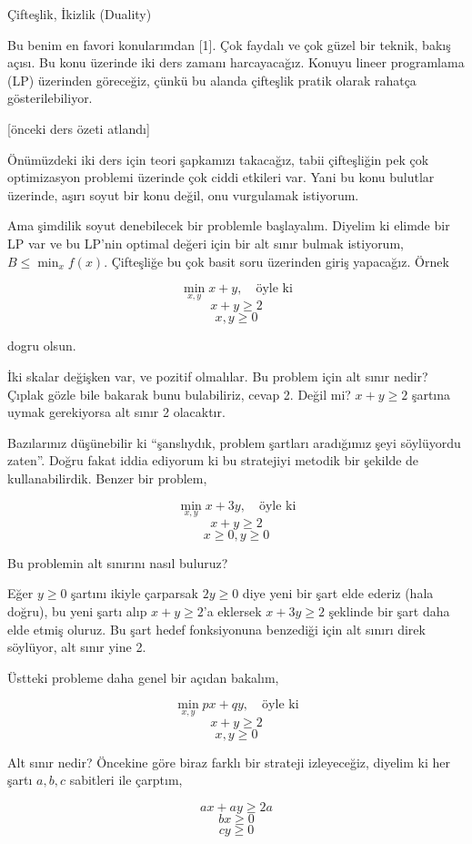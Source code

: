 \documentclass[12pt,fleqn]{article}\usepackage{../../common}
\begin{document}
Çifteşlik, İkizlik (Duality)

Bu benim en favori konularımdan [1]. Çok faydalı ve çok güzel bir teknik,
bakış açısı. Bu konu üzerinde iki ders zamanı harcayacağız. Konuyu lineer
programlama (LP) üzerinden göreceğiz, çünkü bu alanda çifteşlik pratik
olarak rahatça gösterilebiliyor.

[önceki ders özeti atlandı]

Önümüzdeki iki ders için teori şapkamızı takacağız, tabii çifteşliğin pek
çok optimizasyon problemi üzerinde çok ciddi etkileri var. Yani bu konu
bulutlar üzerinde, aşırı soyut bir konu değil, onu vurgulamak istiyorum. 

Ama şimdilik soyut denebilecek bir problemle başlayalım. Diyelim ki elimde
bir LP var ve bu LP'nin optimal değeri için bir alt sınır bulmak istiyorum,
$B \le \min_x f(x)$. Çifteşliğe bu çok basit soru üzerinden giriş
yapacağız. Örnek

$$
\min_{x,y} x+y, \quad \textrm{öyle ki}
$$
$$
x + y \ge 2 
$$
$$
x,y \ge 0
$$

dogru olsun. 

İki skalar değişken var, ve pozitif olmalılar. Bu problem için alt sınır
nedir? Çıplak gözle bile bakarak bunu bulabiliriz, cevap 2. Değil mi? $x+y
\ge 2$ şartına uymak gerekiyorsa alt sınır 2 olacaktır. 

Bazılarınız düşünebilir ki ``şanslıydık, problem şartları aradığımız şeyi
söylüyordu zaten''. Doğru fakat iddia ediyorum ki bu stratejiyi metodik bir
şekilde de kullanabilirdik. Benzer bir problem, 

$$
\min_{x,y} x + 3y, \quad \textrm{öyle ki}
$$
$$
x + y \ge 2 
$$
$$
x \ge 0, y \ge 0
$$

Bu problemin alt sınırını nasıl buluruz?

Eğer $y \ge 0$ şartını ikiyle çarparsak $2y \ge 0$ diye yeni bir şart elde
ederiz (hala doğru), bu yeni şartı alıp $x + y \ge 2$'a eklersek
$x + 3y \ge 2$ şeklinde bir şart daha elde etmiş oluruz. Bu şart hedef
fonksiyonuna benzediği için alt sınırı direk söylüyor, alt sınır yine 2.
 
Üstteki probleme daha genel bir açıdan bakalım,

$$
\min_{x,y} px + qy, \quad \textrm{öyle ki}
$$
$$
x + y \ge 2
$$
$$
x,y \ge 0
$$

Alt sınır nedir? Öncekine göre biraz farklı bir strateji izleyeceğiz,
diyelim ki her şartı $a,b,c$ sabitleri ile çarptım, 

$$
ax + ay \ge 2a
$$
$$
bx \ge 0
$$
$$
cy \ge 0
$$
\end{document}
